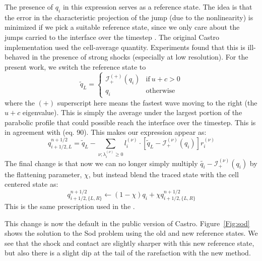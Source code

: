 \documentclass[12pt,preprint]{aastex}
\begin{document}
The presence of $q_i$ in this expression serves as a reference state.
The idea is that the error in the characteristic projection of the
jump (due to the nonlinearity) is minimized if we pick a suitable
reference state, since we only care about the jumps carried to the
interface over the timestep \citep{colellaglaz1985}.  The original
Castro implementation used the cell-average quantity.  Experiments
found that this is ill-behaved in the presence of strong shocks
(especially at low resolution). For the present work, we switch the
reference state to
\begin{equation}
\tilde{q}_L = \left \{ \begin{array}{cc}
       \mathcal{I}_+^{(+)}(q_i) & \mathrm{if~} u + c > 0 \\
       q_i                    & \mathrm{otherwise}
\end{array}
\right .
\end{equation}
where the $(+)$ superscript here means the fastest wave moving to the right
(the $u+c$ eigenvalue).   This is simply the average under the largest
portion of the parabolic profile that could possible reach the interface 
over the timestep.  This is
in agreement with \citet{ppmunsplit} (eq. 90).  This makes our
expression appear as:
\begin{equation}
q_{i+1/2,L}^{n+1/2} = \tilde{q}_L -
   \sum_{\nu;\lambda_i^{(\nu)}\ge 0} l_i^{(\nu)} \cdot \left [
        \tilde{q}_L  - \mathcal{I}^{(\nu)}_+(q_i)
       \right ] r_i^{(\nu)}
\end{equation}
The final change is that now we can no longer simply multiply
$\tilde{q_i} - \mathcal{I}^{(\nu)}_+(q_i)$ by the flattening
parameter, $\chi$, but instead blend the traced state with the cell
centered state as:
  \begin{equation}
  q_{i+1/2,\{L,R\}}^{n+1/2} \leftarrow (1 - \chi) q_i + \chi q_{i+1/2,\{L,R\}}^{n+1/2}
  \end{equation}
This is the same prescription used in the \cite{ppm}.

This change is now the default in the public version of Castro.
Figure~\ref{Fig:sod} shows the
solution to the Sod problem using the old and new reference states.
We see that the shock and contact are slightly sharper with this new
reference state, but also there is a slight dip at the tail of the
rarefaction with the new method.
\end{document}
